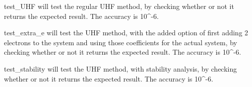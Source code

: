 \documentclass[letterpaper,10pt,english]{sphinxmanual}
\begin{document}
\begin{fulllineitems}
\label{\detokenize{tests:ghf.tests.test_auth.test_UHF}}
test\_UHF will test the regular UHF method, by checking whether or not it returns the expected result. The accuracy is 10\textasciicircum{}-6.

\end{fulllineitems}


\begin{fulllineitems}
\label{\detokenize{tests:ghf.tests.test_auth.test_extra_e}}
test\_extra\_e will test the UHF method, with the added option of first adding 2 electrons to the system and using those coefficients
for the actual system, by checking whether or not it returns the expected result. The accuracy is 10\textasciicircum{}-6.

\end{fulllineitems}


\begin{fulllineitems}
\label{\detokenize{tests:ghf.tests.test_auth.test_stability}}
test\_stability will test the UHF method, with stability analysis, by checking whether or not it returns the expected result. The accuracy is 10\textasciicircum{}-6.

\end{fulllineitems}



\renewcommand{\indexname}{Python Module Index}
\begin{sphinxtheindex}
\let\bigletter\sphinxstyleindexlettergroup
\bigletter{g}
\item\relax{}
\item\relax{}
\item\relax{}
\item\relax{}
\item\relax{}
\item\relax{}
\end{sphinxtheindex}

\renewcommand{\indexname}{Index}
\printindex
\end{document}

